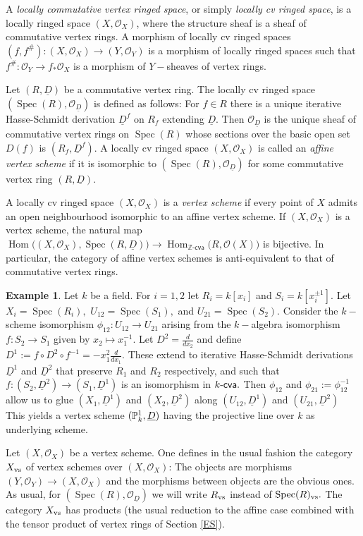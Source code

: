 \documentclass{article}
\theoremstyle{definition}
\newtheorem{ex}[thm]{Example}
\def\Hom{\ensuremath{\operatorname{Hom}}}
\def\Spec{\ensuremath{\operatorname{Spec}}}
\def\kcva{\ensuremath{k\text{-\textup{\textsf{cva}}}}}
\def\cO{\ensuremath{\mathcal{O}}}
\def\uD{\ensuremath{\underline{D}}}
\begin{document}
{A \emph{locally commutative vertex ringed space}, or simply \emph{locally cv ringed space}, is a locally ringed space $(X, \cO_X)$, where the structure sheaf is a sheaf of commutative vertex rings.
A morphism of locally cv ringed spaces $(f, f^\#) \colon (X, \mathcal O_X) \to (Y, \mathcal O_Y)$ is a morphism of locally ringed spaces such that $f^\# \colon \mathcal O_Y \to f_\ast \mathcal O_X$ is a morphism of $Y-$sheaves of vertex rings. 

 Let $(R, \underline{D})$ be a commutative vertex ring. The locally cv ringed space $(\Spec (R), \cO_{\uD})$ 
 is defined as follows: For $f \in R$ there is a unique iterative Hasse-Schmidt derivation ${\uD}^f$ on $R_f$ extending $\uD.$ Then $\cO_{\uD}$ is the unique sheaf of commutative vertex rings on $\Spec(R)$ whose sections over the basic open set $D(f)$ is $(R_f, \underline{D}^f).$ A locally cv ringed space $(X, \cO_X)$ is called an {\it affine vertex scheme} if it is isomorphic to $(\Spec (R), \cO_{\uD})$ for some commutative vertex ring $(R, \uD).$ 
 
 A locally cv ringed space $(X, \cO_X)$ is a {\it vertex scheme} if every point of $X$ admits an open neighbourhood isomorphic to an affine vertex scheme. If $(X, \cO_X)$ is a vertex scheme, the natural map $\Hom\!\big((X, \cO_X), \Spec(R,\uD)\big) \to \Hom_{\mathbb Z\textsf{-cva}}\!\big(R, \cO(X)\big)$ is bijective. In particular, the category of affine vertex schemes is anti-equivalent to that of commutative vertex rings.
 \begin{ex}\label{P1} Let $k$ be a field. For $i = 1,2$ let $R_i = k[x_i]$ and $S_i = k [x_i^{\pm 1}].$ Let $X_i = \Spec(R_i),$ $U_{12} = \Spec(S_1),$ and $U_{21} = \Spec(S_2).$ Consider the $k-$scheme isomorphism $\phi_{12} \colon U_{12} \to U_{21}$ arising  from the $k-$algebra isomorphism $f \colon S_2 \to S_1$ given by $x_2 \mapsto x_1^{-1}.$  Let $D^2 = \frac{d}{d x_2}$ and define $D^1 := f \circ D^2 \circ f^{-1} = - x_1^2 \frac{d}{d x_1}$. 
	 These extend to iterative Hasse-Schmidt derivations $\uD^1$ and $\uD^2$ that preserve $R_1$ and $R_2$ respectively, and such that $f \colon (S_2, \uD^2) \to (S_1, \uD^1)$ is an isomorphism in $\kcva.$ Then $\phi_{12}$ and $\phi_{21} := \phi_{12}^{-1}$  allow us to glue $(X_1, \uD^1)$ and $(X_2, \uD^2)$ along $(U_{12} , \uD^1)$ and $(U_{21}, \uD^2)$  This yields a vertex scheme $(\Bbb{P}_k^1, \uD)$ having the projective line over $k$ as underlying scheme.\end{ex}
 
 Let $(X, \cO_X)$ be a vertex scheme. One defines in the usual fashion the category $X_{\rm vs}$ of vertex schemes over  $(X, \cO_X)$: The objects are morphisms $(Y, \cO_Y) \to (X, \cO_X)$ and the morphisms between objects are the obvious ones. As usual, for $(\Spec(R), \cO_{\uD})$ we will write $R_{\rm vs}$ instead of $\Spec(R)_{\rm vs}.$ The category $X_{\rm vs}$ has products (the usual reduction to the affine case combined with the tensor product of vertex rings of Section \ref{ES}).
 
}
\end{document}
